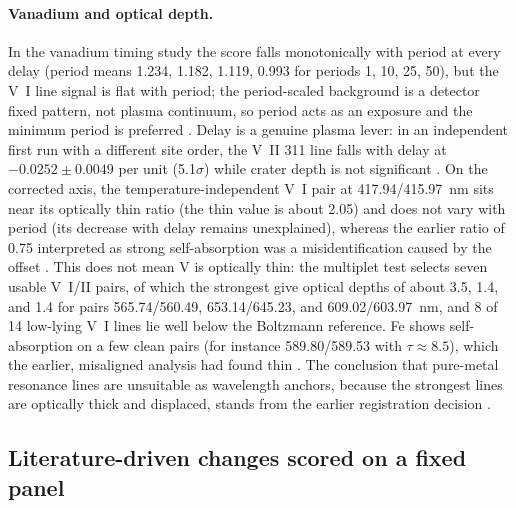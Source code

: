 \paragraph{Vanadium and optical depth.}
In the vanadium timing study the score falls monotonically with period at every delay (period means 1.234, 1.182, 1.119, 0.993 for periods 1, 10, 25, 50), but the V~I line signal is flat with period; the period-scaled background is a detector fixed pattern, not plasma continuum, so period acts as an exposure and the minimum period is preferred %
. Delay is a genuine plasma lever: in an independent first run with a different site order, the V~II 311 line falls with delay at $-0.0252\pm0.0049$ per unit (5.1$\sigma$) while crater depth is not significant %
. On the corrected axis, the temperature-independent V~I pair at 417.94/\SI{415.97}{\nano\metre} sits near its optically thin ratio (the thin value is about 2.05) and does not vary with period (its decrease with delay remains unexplained), whereas the earlier ratio of 0.75 interpreted as strong self-absorption was a misidentification caused by the offset %
. This does not mean V is optically thin: the multiplet test selects seven usable V~I/II pairs, of which the strongest give optical depths of about 3.5, 1.4, and 1.4 for pairs 565.74/560.49, 653.14/645.23, and 609.02/\SI{603.97}{\nano\metre}, and 8 of 14 low-lying V~I lines lie well below the Boltzmann reference. Fe shows self-absorption on a few clean pairs (for instance 589.80/589.53 with $\tau\approx8.5$), which the earlier, misaligned analysis had found thin %
. The conclusion that pure-metal resonance lines are unsuitable as wavelength anchors, because the strongest lines are optically thick and displaced, stands from the earlier registration decision %
.

\subsection{Literature-driven changes scored on a fixed panel}
\label{sec:results-ab}

